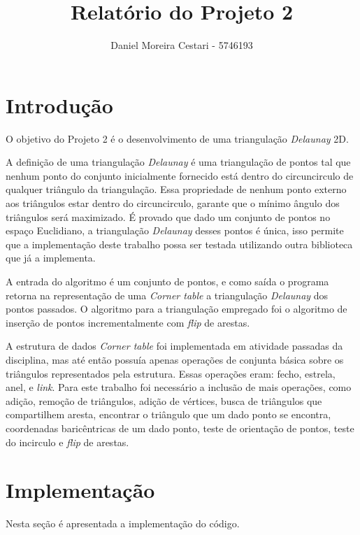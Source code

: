 \documentclass[a4paper]{article}
\title{Relatório do Projeto 2}
\author{Daniel Moreira Cestari - 5746193}
\begin{document}
\maketitle

\section{Introdução}

O objetivo do Projeto 2 é o desenvolvimento de uma triangulação \textit{Delaunay} 2D. 

A definição de uma triangulação \textit{Delaunay} é uma triangulação de pontos tal que nenhum ponto do conjunto inicialmente fornecido está dentro do circuncirculo de qualquer triângulo da triangulação. Essa propriedade de nenhum ponto externo aos triângulos estar dentro do circuncirculo, garante que o mínimo ângulo dos triângulos será maximizado. É provado que dado um conjunto de pontos no espaço Euclidiano, a triangulação \textit{Delaunay} desses pontos é única, isso permite que a implementação deste trabalho possa ser testada utilizando outra biblioteca que já a implementa.

A entrada do algoritmo é um conjunto de pontos, e como saída o programa retorna na representação de uma \textit{Corner table} a triangulação \textit{Delaunay}  dos pontos passados.  O algoritmo para a triangulação empregado foi o algoritmo de inserção de pontos incrementalmente com \textit{flip} de arestas.

A estrutura de dados \textit{Corner table} foi implementada em atividade passadas da disciplina, mas até então possuía apenas operações de conjunta básica sobre os triângulos representados pela estrutura. Essas operações eram: fecho, estrela, anel, e \textit{link}. Para este trabalho foi necessário a inclusão de mais operações, como adição, remoção de triângulos, adição de vértices, busca de triângulos que compartilhem aresta, encontrar o triângulo que um dado ponto se encontra, coordenadas baricêntricas de um dado ponto, teste de orientação de pontos, teste do incirculo e \textit{flip} de arestas.



\section{Implementação}

Nesta seção é apresentada a implementação do código.
\end{document}
